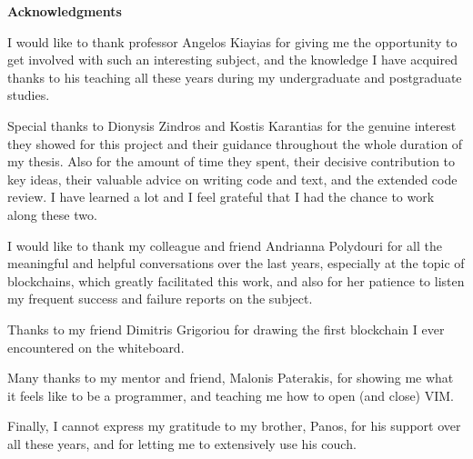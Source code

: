\newpage
\begin{center}
\large{\textbf{Acknowledgments}}
\end{center}

I would like to thank professor Angelos Kiayias for giving me the opportunity
to get involved with such an interesting subject, and the knowledge I have
acquired thanks to his teaching all these years during my undergraduate and
postgraduate studies.

Special thanks to Dionysis Zindros and Kostis Karantias for the genuine
interest they showed for this project and their guidance throughout the whole
duration of my thesis. Also for the amount of time they spent, their decisive
contribution to key ideas, their valuable advice on writing code and text, and
the extended code review. I have learned a lot and I feel grateful that I had
the chance to work along these two.

I would like to thank my colleague and friend Andrianna Polydouri for all the
meaningful and helpful conversations over the last years, especially at the
topic of blockchains, which greatly facilitated this work, and also for her
patience to listen my frequent success and failure reports on the subject.

Thanks to my friend Dimitris Grigoriou for drawing the first blockchain I ever
encountered on the whiteboard.

Many thanks to my mentor and friend, Malonis Paterakis, for showing me
what it feels like to be a programmer, and teaching me how to open (and close)
VIM.

Finally, I cannot express my gratitude to my brother, Panos, for his support
over all these years, and for letting me to extensively use his couch.
